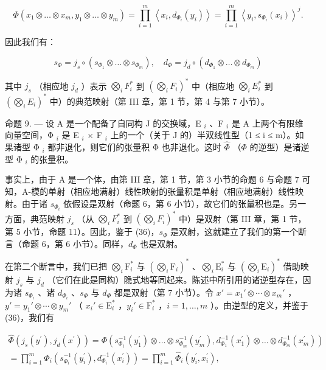 \[
\Phi (x _ {1} \otimes \dots \otimes x _ {m}, y _ {1} \otimes \dots \otimes y _ {m}) = \prod_ {i = 1} ^ {m} \left\langle x _ {i}, d _ {\Phi_ {i}} (y _ {i}) \right\rangle = \prod_ {i = 1} ^ {m} \left\langle y _ {i}, s _ {\Phi_ {i}} (x _ {i}) \right\rangle^ {j}.
\]

因此我们有：

\[
s _ {\Phi} = j _ {s} \circ (s _ {\Phi_ {1}} \otimes \dots \otimes s _ {\Phi_ {m}}), \quad d _ {\Phi} = j _ {d} \circ (d _ {\Phi_ {1}} \otimes \dots \otimes d _ {\Phi_ {m}})\tag{36}
\]

其中 \(j_s\) （相应地 \(j_d\) ）表示 \(\bigotimes_i F_i^*\) 到 \((\bigotimes_i F_i)^*\) 中（相应地 \(\bigotimes_i E_i^*\) 到 \((\bigotimes_i E_i)^*\) 中）的典范映射（第 III 章，第 1 节，第 4 与第 7 小节）。

命题 9. — 设 A 是一个配备了自同构 J 的交换域，E \(_{i}\) 、F \(_{i}\) 是 A 上两个有限维向量空间，Φ \(_{i}\) 是 E \(_{i}\) × F \(_{i}\) 上的一个（关于 J 的）半双线性型（1 ≤ i ≤ m）。如果诸型 Φ \(_{i}\) 都非退化，则它们的张量积 Φ 也非退化。这时 \(\hat{\Phi}\) （\(\Phi\) 的逆型）是诸逆型 Φ \(_{i}\) 的张量积。

事实上，由于 A 是一个体，由第 III 章，第 1 节，第 3 小节的命题 6 与命题 7 可知，A-模的单射（相应地满射）线性映射的张量积是单射（相应地满射）线性映射。由于诸 \(s_{\Phi_i}\) 依假设是双射（命题 6，第 6 小节），故它们的张量积也是。另一方面，典范映射 \(j_s\) （从 \(\bigotimes_i F_i^*\) 到 \((\bigotimes_i F_i)^*\) 中）是双射（第 III 章，第 1 节，第 5 小节，命题 11）。因此，鉴于 (36)，\(s_\Phi\) 是双射，这就建立了我们的第一个断言（命题 6，第 6 小节）。同样，\(d_\Phi\) 也是双射。

在第二个断言中，我们已把 \(\bigotimes_{i} \mathrm{F}_{i}^{*}\) 与 \((\bigotimes_{i} \mathrm{F}_{i})^{*}\) 、\(\bigotimes_{i} \mathrm{E}_{i}^{*}\) 与 \((\bigotimes_{i} \mathrm{E}_{i})^{*}\) 借助映射 \(j_{s}\) 与 \(j_{d}\) （它们在此是同构）隐式地等同起来。陈述中所引用的诸逆型存在，因为诸 \(s_{\Phi_{i}}\) 、诸 \(d_{\Phi_{i}}\) 、\(s_{\Phi}\) 与 \(d_{\Phi}\) 都是双射（第 7 小节）。令 \(x' = x_{1}' \otimes \cdots \otimes x_{m}'\) ，\(y' = y_{1}' \otimes \cdots \otimes y_{m}'\) （ \(x_{i}' \in \mathrm{E}_{i}^{*}\) ，\(y_{i}' \in \mathrm{F}_{i}^{*}\) ，\(i = 1, \ldots, m\) ）。由逆型的定义，并鉴于 (36)，我们有

\[
\begin{array}{l} \widehat {\Phi} (j _ {s} (y ^ {\prime}), j _ {d} (x ^ {\prime})) = \Phi (s _ {\Phi_ {1}} ^ {- 1} (y _ {1} ^ {\prime}) \otimes \dots \otimes s _ {\Phi_ {m}} ^ {- 1} (y _ {m} ^ {\prime}), d _ {\Phi_ {1}} ^ {- 1} (x _ {1} ^ {\prime}) \otimes \dots \otimes d _ {\Phi_ {m}} ^ {- 1} (x _ {m} ^ {\prime})) \\ = \prod_ {i = 1} ^ {m} \Phi_ {i} (s _ {\Phi_ {i}} ^ {- 1} (y _ {i} ^ {\prime}), d _ {\Phi_ {i}} ^ {- 1} (x _ {i} ^ {\prime})) = \prod_ {i = 1} ^ {m} \widehat {\Phi} _ {i} (y _ {i} ^ {\prime}, x _ {i} ^ {\prime}), \end{array}
\]

